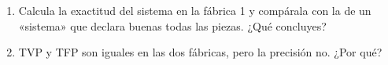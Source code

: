 \documentclass[11pt]{article}
\newcommand{\espacio}[1]{\par\vspace{#1}}
\begin{document}
\begin{enumerate}
\begin{enumerate}
  \item Calcula la exactitud del sistema en la fábrica 1 y compárala con la de un «sistema» que declara buenas todas las piezas. ¿Qué concluyes?
  \espacio{3cm}

  \item TVP y TFP son iguales en las dos fábricas, pero la precisión no. ¿Por qué?
  \espacio{2.5cm}
\end{enumerate}

\end{enumerate}
\end{document}
